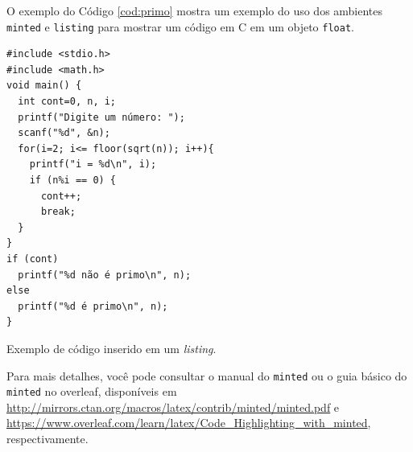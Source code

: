 O exemplo do Código \ref{cod:primo} mostra um exemplo do uso dos ambientes \texttt{minted} e \texttt{listing} para mostrar um código em C em um objeto \texttt{float}.

\begin{listing}[ht]
\begin{verbatim}
#include <stdio.h>
#include <math.h>
void main() {
  int cont=0, n, i;
  printf("Digite um número: ");
  scanf("%d", &n);
  for(i=2; i<= floor(sqrt(n)); i++){
    printf("i = %d\n", i);   
    if (n%i == 0) {
      cont++;
      break;
  }      
} 
if (cont) 
  printf("%d não é primo\n", n);
else
  printf("%d é primo\n", n);
}
\end{verbatim}
\caption{Exemplo de código inserido em um \textit{listing}.}
\label{cod:primo}
\end{listing}

Para mais detalhes, você pode consultar o manual do \texttt{minted} ou o guia básico do \texttt{minted} no \gls{overleaf}, disponíveis em 
\url{http://mirrors.ctan.org/macros/latex/contrib/minted/minted.pdf} \parencite{minted} e
\url{https://www.overleaf.com/learn/latex/Code_Highlighting_with_minted}, respectivamente.
